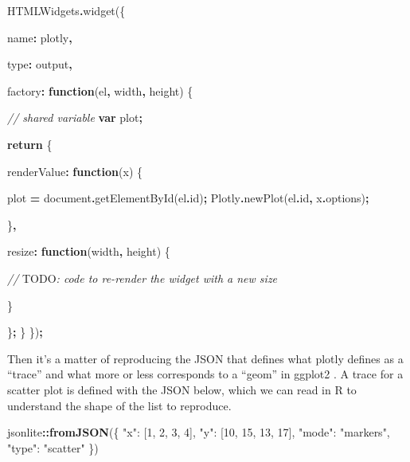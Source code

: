 \documentclass[
]{krantz}
\makeatletter
\newenvironment{Shaded}{\begin{snugshade}}{\end{snugshade}}
\newcommand{\AlertTok}[1]{\textcolor[rgb]{0.33,0.33,0.33}{#1}}
\newcommand{\AttributeTok}[1]{\textcolor[rgb]{0.61,0.61,0.61}{#1}}
\newcommand{\BuiltInTok}[1]{#1}
\newcommand{\CommentTok}[1]{\textcolor[rgb]{0.37,0.37,0.37}{\textit{#1}}}
\newcommand{\ControlFlowTok}[1]{\textcolor[rgb]{0.27,0.27,0.27}{\textbf{#1}}}
\newcommand{\DataTypeTok}[1]{\textcolor[rgb]{0.27,0.27,0.27}{#1}}
\newcommand{\FunctionTok}[1]{\textcolor[rgb]{0,0,0}{#1}}
\newcommand{\KeywordTok}[1]{\textcolor[rgb]{0.27,0.27,0.27}{\textbf{#1}}}
\newcommand{\NormalTok}[1]{#1}
\newcommand{\OperatorTok}[1]{\textcolor[rgb]{0.43,0.43,0.43}{\textbf{#1}}}
\newcommand{\StringTok}[1]{\textcolor[rgb]{0.5,0.5,0.5}{#1}}
\newenvironment{kframe}{%
\medskip{}
\setlength{\fboxsep}{.8em}
 \def\at@end@of@kframe{}%
 \ifinner\ifhmode%
  \def\at@end@of@kframe{\end{minipage}}%
  \begin{minipage}{\columnwidth}%
 \fi\fi%
 \def\FrameCommand##1{\hskip\@totalleftmargin \hskip-\fboxsep
 \colorbox{shadecolor}{##1}\hskip-\fboxsep
     \hskip-\linewidth \hskip-\@totalleftmargin \hskip\columnwidth}%
 \MakeFramed {\advance\hsize-\width
   \@totalleftmargin\z@ \linewidth\hsize
   \@setminipage}}%
 {\par\unskip\endMakeFramed%
 \at@end@of@kframe}
\renewenvironment{Shaded}{\begin{kframe}}{\end{kframe}}
\makeatother
\begin{document}
\begin{Shaded}
\begin{Highlighting}[]
\NormalTok{HTMLWidgets}\OperatorTok{.}\FunctionTok{widget}\NormalTok{(\{}

  \DataTypeTok{name}\OperatorTok{:} \StringTok{\textquotesingle{}plotly\textquotesingle{}}\OperatorTok{,}

  \DataTypeTok{type}\OperatorTok{:} \StringTok{\textquotesingle{}output\textquotesingle{}}\OperatorTok{,}

  \DataTypeTok{factory}\OperatorTok{:} \KeywordTok{function}\NormalTok{(el}\OperatorTok{,}\NormalTok{ width}\OperatorTok{,}\NormalTok{ height) \{}

    \CommentTok{// shared variable}
    \KeywordTok{var}\NormalTok{ plot}\OperatorTok{;}

    \ControlFlowTok{return}\NormalTok{ \{}

      \DataTypeTok{renderValue}\OperatorTok{:} \KeywordTok{function}\NormalTok{(x) \{}

\NormalTok{        plot }\OperatorTok{=} \BuiltInTok{document}\OperatorTok{.}\FunctionTok{getElementById}\NormalTok{(el}\OperatorTok{.}\AttributeTok{id}\NormalTok{)}\OperatorTok{;}
\NormalTok{        Plotly}\OperatorTok{.}\FunctionTok{newPlot}\NormalTok{(el}\OperatorTok{.}\AttributeTok{id}\OperatorTok{,}\NormalTok{ x}\OperatorTok{.}\AttributeTok{options}\NormalTok{)}\OperatorTok{;}

\NormalTok{      \}}\OperatorTok{,}

      \DataTypeTok{resize}\OperatorTok{:} \KeywordTok{function}\NormalTok{(width}\OperatorTok{,}\NormalTok{ height) \{}

        \CommentTok{// }\AlertTok{TODO}\CommentTok{: code to re{-}render the widget with a new size}

\NormalTok{      \}}

\NormalTok{    \}}\OperatorTok{;}
\NormalTok{  \}}
\NormalTok{\})}\OperatorTok{;}
\end{Highlighting}
\end{Shaded}

Then it's a matter of reproducing the JSON that defines what plotly defines as a ``trace'' and what more or less corresponds to a ``geom'' in ggplot2 \citep{R-ggplot2}. A trace for a scatter plot is defined with the JSON below, which we can read in R to understand the shape of the list to reproduce.

\begin{Shaded}
\begin{Highlighting}[]
\NormalTok{jsonlite}\OperatorTok{::}\KeywordTok{fromJSON}\NormalTok{(}\StringTok{\textquotesingle{}\{}
\StringTok{    "x": [1, 2, 3, 4],}
\StringTok{    "y": [10, 15, 13, 17],}
\StringTok{    "mode": "markers",}
\StringTok{    "type": "scatter"}
\StringTok{\}\textquotesingle{}}\NormalTok{)}
\end{Highlighting}
\end{Shaded}
\end{document}
